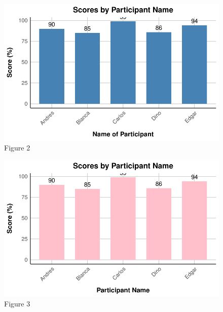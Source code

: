 \documentclass[
  letterpaper,
  DIV=11,
  numbers=noendperiod]{scrartcl}
\begin{document}
\begin{figure}[H]

{\centering \includegraphics{collaborative_notebook_files/figure-pdf/publication quality figure 2-1.pdf}

}

\caption{Figure 2}

\end{figure}%

\begin{figure}[H]

{\centering \includegraphics{collaborative_notebook_files/figure-pdf/publication quality figure 3-1.pdf}

}

\caption{Figure 3}

\end{figure}%
\end{document}
